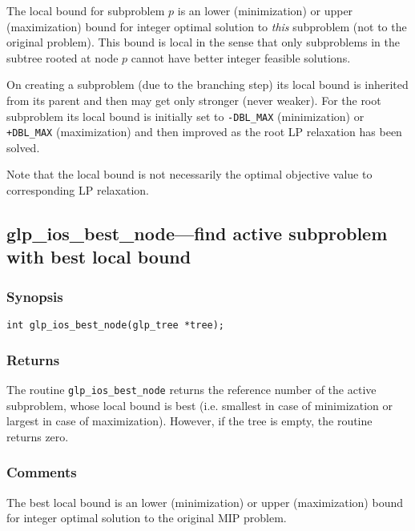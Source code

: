 The local bound for subproblem $p$ is an lower (minimization) or upper
(maximization) bound for integer optimal solution to {\it this}
subproblem (not to the original problem). This bound is local in the
sense that only subproblems in the subtree rooted at node $p$ cannot
have better integer feasible solutions.

On creating a subproblem (due to the branching step) its local bound is
inherited from its parent and then may get only stronger (never weaker).
For the root subproblem its local bound is initially set to
\verb|-DBL_MAX| (minimization) or \verb|+DBL_MAX| (maximization) and
then improved as the root LP relaxation has been solved.

Note that the local bound is not necessarily the optimal objective value
to corresponding LP relaxation.

\subsection{glp\_ios\_best\_node---find active subproblem with best
local bound}

\subsubsection*{Synopsis}

\begin{verbatim}
int glp_ios_best_node(glp_tree *tree);
\end{verbatim}

\subsubsection*{Returns}

The routine \verb|glp_ios_best_node| returns the reference number of
the active subproblem, whose local bound is best (i.e. smallest in case
of minimization or largest in case of maximization). However, if the
tree is empty, the routine returns zero.

\subsubsection*{Comments}

The best local bound is an lower (minimization) or upper (maximization)
bound for integer optimal solution to the original MIP problem.


